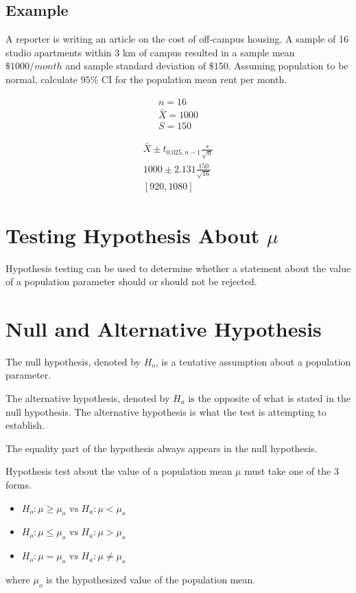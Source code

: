 \documentclass{article}
\begin{document}
    \subsection*{Example}
    A reporter is writing an article on the cost of 
    off-campus housing. A sample of 16 studio apartments within 3 km of campus 
    resulted in a sample mean $\$1000/month$ and sample standard deviation of $\$150$.
    Assuming population to be normal, calculate $95\%$ CI for the population mean rent per month.

    \begin{align*}
        n = 16\\
        \bar{X} = 1000\\
        S = 150
    \end{align*}

    \begin{align*}
        \bar{X} \pm t_{0.025, n-1}\frac{s}{\sqrt{n}}\\
        1000 \pm 2.131 \frac{150}{\sqrt{16}}\\
        [920, 1080]
    \end{align*}

    \section*{Testing Hypothesis About $\mu$}
    Hypothesis testing can be used to determine whether 
    a statement about the value of a population parameter should or 
    should not be rejected.

    \section*{Null and Alternative Hypothesis}
    The null hypothesis, denoted by $H_{o}$, is a tentative assumption 
    about a population parameter.\par

    The alternative hypothesis, denoted by $H_{a}$ is the opposite of what is 
    stated in the null hypothesis. 
    The alternative hypothesis is what the test is attempting to establish. \par
    
    The equality part of the hypothesis always appears in the null hypothesis.\par

    Hypothesis test about the value of a population mean 
    $\mu$ must take one of the 3 forms.

    \begin{itemize}
        \item $H_{o}: \mu \geq \mu_{o} \text{ vs } H_{a}: \mu < \mu_{o}$
        \item $H_{o}: \mu \leq \mu_{o} \text{ vs } H_{a}: \mu > \mu_{o}$
        \item $H_{o}: \mu = \mu_{o} \text{ vs } H_{a}: \mu \neq \mu_{o}$
    \end{itemize}
    where $\mu_{o}$ is the hypothesized value of the population mean.\par
\end{document}

